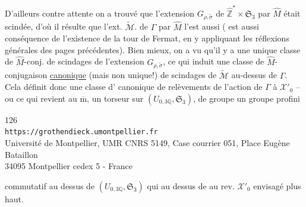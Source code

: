 D'ailleurs contre  attente on a trouvé que l'extension $G_{\rho,\widetilde\sigma}$ de $\widehat{\mathbb Z}^{*}\times\mathfrak S_3$ par $\widehat M$ était scindée, d'où il résulte que  l'ext. $\widetilde{\mathcal M}$. de $\Gamma$ par $\widehat M$ l'est aussi (  est aussi conséquence de l'existence de la tour de Fermat, en y appliquant les réflexions générales des pages précédentes). Bien mieux, on a vu qu'il y a une unique classe de $\widehat M$-conj. de scindages de l'extension $G_{\rho,\widetilde\sigma}$, ce qui induit une classe de $\widehat M$-conjugaison \uline{canonique} (mais non unique!) de  scindages de $\widetilde{\mathcal M}$ au-dessus de $\Gamma$. Cela définit donc une classe d' canonique de relèvements de l'action de $\Gamma$  à $\mathcal X'_0$ -- ou ce qui revient au $\overline{\mathrm m}$, un torseur sur $(U_{0,3\mathbb Q},\mathfrak S_3)$, de groupe un groupe profini



\begin{center}
\small
126\\
\texttt{https://grothendieck.umontpellier.fr}\\
Université de Montpellier, UMR CNRS 5149, Case courrier 051, Place Eugène Bataillon\\
34095 Montpellier cedex 5 - France
\end{center}


commutatif au dessus de $(U_{0,3\mathbb Q},\mathfrak S_3)$ qui au dessus de   au rev. $\mathcal X'_0$ envisagé plus haut.

